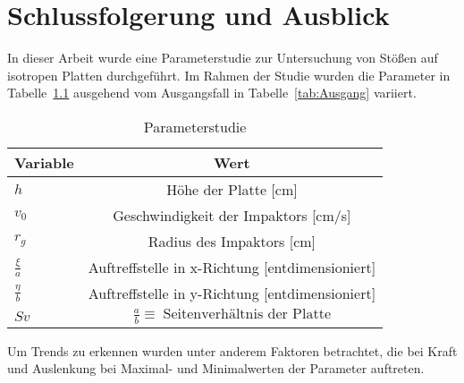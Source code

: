 \chapter{Schlussfolgerung und Ausblick}
\label{Conclusion}

In dieser Arbeit wurde eine Parameterstudie zur Untersuchung von Stößen auf isotropen Platten durchgeführt. Im Rahmen der Studie wurden die Parameter in Tabelle~\ref{tab:VariierteParams} ausgehend vom Ausgangsfall in Tabelle~\ref{tab:Ausgang} variiert.

\begin{table}[H]
	\begin{center}
		\caption{Parameterstudie}
		\label{tab:VariierteParams}
		\begin{tabular}{l|c}
			\textbf{Variable} & \textbf{Wert}\\
			\hline
			$h$ & Höhe der Platte [cm]\\
			$v_{0}$ & Geschwindigkeit der Impaktors [cm/s]\\
			$r_{g}$ & Radius des Impaktors [cm]\\
			$\frac{\xi}{a}$ & Auftreffstelle in x-Richtung [entdimensioniert]\\
			$\frac{\eta}{b}$ & Auftreffstelle in y-Richtung [entdimensioniert]\\
			$Sv$ & $\frac{a}{b} \equiv \; \mbox{Seitenverhältnis der Platte}$ \\		
		\end{tabular}
	\end{center}
\end{table}

Um Trends zu erkennen wurden unter anderem Faktoren betrachtet, die bei Kraft und Auslenkung bei Maximal- und Minimalwerten der Parameter auftreten.\\
